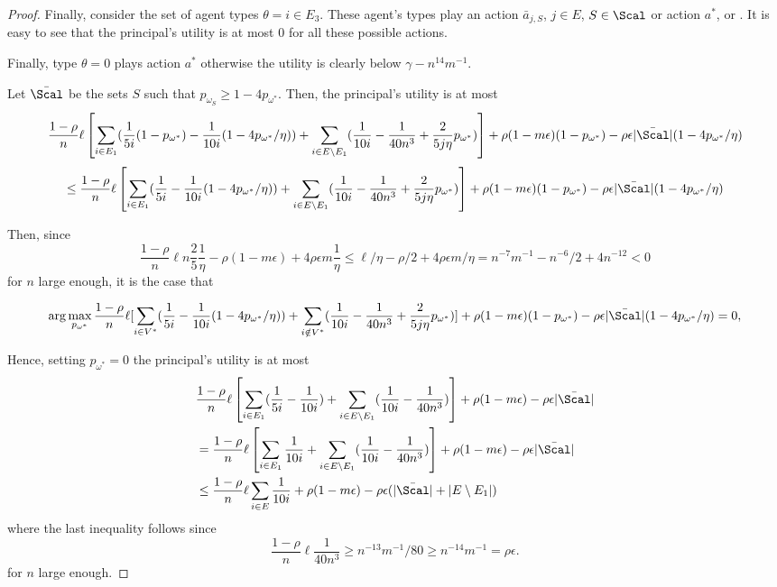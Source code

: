 \begin{proof}
	Finally, consider the set of agent types $\theta=i\in E_3$. These agent's types play an action $\bar a_{j,S}$, $j\in E$, $S\in \Scal$ or action $a^*$, or . It is easy to see that the principal's utility is at most $0$ for all these possible actions. 
	
	Finally, type $\theta=0$ plays action $a^*$ otherwise the utility is clearly below $\gamma-n^{14}m^{-1}$.
	
	
	
	Let $\bar \Scal$ be the sets $S$ such that $p_{\omega_S}\ge 1- 4 p_{\omega^*}$.
	Then, the principal's utility is at most 
	\[ \frac{1-\rho}{n} \ell \left[\sum_{i \in E_1}( \frac{1}{5i} (1-p_{\omega^{*}}) - \frac{1}{10i}( 1-4p_{\omega^*}/\eta))  + \sum_{i \in E \setminus E_1} (\frac{1}{10i}-\frac{1}{40n^3}  + \frac{2}{5j\eta}p_{\omega^*})\right] + \rho (1-m\epsilon) (1-p_{\omega^*}) - \rho \epsilon |\bar\Scal|(1-4p_{\omega^*}/\eta)\]
	\[\le \frac{1-\rho}{n} \ell \left[\sum_{i \in E_1}( \frac{1}{5i}  - \frac{1}{10i}( 1-4p_{\omega^*}/\eta))  + \sum_{i \in E \setminus E_1} (\frac{1}{10i}-\frac{1}{40n^3}  + \frac{2}{5j\eta}p_{\omega^*})\right] + \rho (1-m\epsilon) (1-p_{\omega^*}) - \rho \epsilon |\bar\Scal|(1-4p_{\omega^*}/\eta)   \]
	
	
	Then, since
	\[ \frac{1-\rho}{n} \ell  n \frac{2}{5} \frac{1}{\eta} - \rho (1-m\epsilon) + 4 \rho \epsilon m \frac{1}{\eta} \le  \ell/\eta -\rho/2 + 4 \rho \epsilon m/\eta=n^{-7}m^{-1} - n^{-6}/2 + 4 n^{-12}<0 \]
	for $n$ large enough, it is the case that
	
	\[\arg \max_{p_{\omega^*}}  \frac{1-\rho}{n} \ell [\sum_{i \in V^*}( \frac{1}{5i}  - \frac{1}{10i}( 1-4p_{\omega^*}/\eta))  + \sum_{i \notin V^*} (\frac{1}{10i}-\frac{1}{40n^3}  + \frac{2}{5j\eta}p_{\omega^*})] + \rho (1-m\epsilon) (1-p_{\omega^*}) - \rho \epsilon |\bar\Scal|(1-4p_{\omega^*}/\eta)= 0,\]
	
	Hence, setting $p_{\omega^*}=0$ the principal's utility is at most
	\begin{align}
		&\frac{1-\rho}{n} \ell \left[\sum_{i \in E_1}( \frac{1}{5i}  - \frac{1}{10i})  + \sum_{i \in E \setminus E_1} (\frac{1}{10i}-\frac{1}{40n^3}) \right] + \rho (1-m\epsilon) - \rho \epsilon |\bar\Scal|\\
		&=\frac{1-\rho}{n} \ell \left[\sum_{i \in E_1} \frac{1}{10i} + \sum_{i \in E \setminus E_1} (\frac{1}{10i}-\frac{1}{40n^3}) \right] + \rho (1-m\epsilon) - \rho \epsilon |\bar\Scal|\\
		& \le \frac{1-\rho}{n} \ell \sum_{i \in E} \frac{1}{10i}    + \rho (1-m\epsilon) - \rho \epsilon (|\bar\Scal|+ |E\setminus E_1|) 
	\end{align}
	where the last inequality follows since 
	\[\frac{1-\rho}{n} \ell \frac{1}{40n^3}\ge n^{-13} m^{-1}/80 \ge n^{-14} m^{-1}  = \rho \epsilon. \]
	for $n$ large enough.
	

\end{proof}
